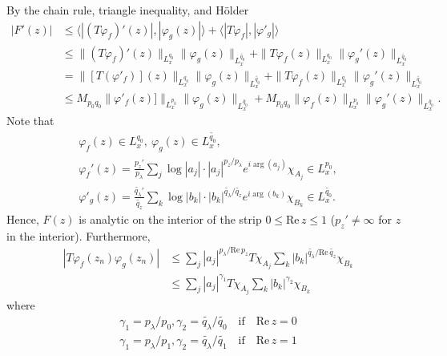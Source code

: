 \documentclass[12pt,reqno]{amsart}
\numberwithin{equation}{section}  %
\numberwithin{figure}{section}
\newcommand{\vp}{\varphi}
\theoremstyle{plain}
\theoremstyle{definition}
\theoremstyle{remark}
\begin{document}
%
%
By the chain rule, triangle inequality, and H{\"o}lder
%
%
\begin{equation*}
\begin{split}
| F'(z) |
& \le \langle | (T{\vp_f})'(z) |, | \vp_{g}(z) | \rangle + \langle | T
\vp_{f} |, |\vp'_{g}| \rangle
\\
& \le \| (T\vp_{f})'(z) \|_{L_x^{q_0}} \|\vp_{g}(z)\|_{L_x^{\tilde{q_0}}} + \|
T\vp_{f}(z) \|_{L_x^{q_0}} \|\vp_{g}'(z) \|_{L_x^{\tilde{q_0}}}
\\
& = \| [T( \vp'_{f})](z) \|_{L_x^{q_0}} \|\vp_{g}(z)\|_{L_x^{\tilde{q_0}}} + \|
T\vp_{f}(z) \|_{L_x^{q_0}} \|\vp_{g}'(z) \|_{L_x^{\tilde{q_0}}}
\\
& \le M_{p_0 q_0}
\| \vp'_{f}(z)] \|_{L_x^{p_0}} \|\vp_{g}(z)\|_{L_x^{\tilde{q_0}}} + M_{p_0 q_0}\|
\vp_{f}(z) \|_{L_x^{p_0}} \|\vp_{g}'(z) \|_{L_x^{\tilde{q_0}}}.
\end{split}
\end{equation*}
%
%
Note that
%
%
\begin{gather*}
	\vp_{f}(z) \in L^{q_0}_x, \ \vp_{g}(z) \in L_{x}^{\tilde{q_0}},
\\
\vp_{f}'(z) = \frac{p_z'}{p_\lambda} \sum_{j} \log |a_j| \cdot |
a_j|^{p_z/p_\lambda}e^{i \arg(a_j)} \chi_{A_j} \in L^{p_0}_x,
\\
\vp'_{g}(z) =  \frac{\tilde{q_\lambda}'}{\tilde{q_z}} \sum_{k} \log|b_k| \cdot
| b_k |^{\tilde{q_\lambda} / \tilde{q_z}} e^{i
\arg(b_k)} \chi_{B_k} \in L_{x}^{\tilde{q_0}}.
\end{gather*}
%
%
Hence, $F(z)$ is analytic on the interior of the strip $0 \le \text{Re}\, z \le
1$ ($p_z' \neq \infty$ for $z$ in the interior). Furthermore,
%
%
\begin{equation*}
\begin{split}
| T \vp_{f}(z_n) \vp_{g}(z_n) | 
& \le \sum_{j} | a_j |^{p_\lambda / \text{Re}\, p_z} T \chi_{A_j}
\sum_{k} | b_k |^{\tilde{q_\lambda} / \text{Re}\, \tilde{q_z}} \chi_{B_k}
\\
& \le \sum_{j} | a_j |^{\gamma_1} T \chi_{A_j}
\sum_{k} | b_k |^{\gamma_2} \chi_{B_k}\end{split}
\end{equation*}
%
%
where
%
%
\begin{gather*}
\gamma_1 = p_\lambda/p_0, \gamma_2 = \tilde{q_\lambda}/\tilde{q_0} \quad
\text{if} \quad \text{Re}\, z=0
\\
\gamma_1 = p_\lambda/p_1, \gamma_2 = \tilde{q_\lambda}/\tilde{q_1}\quad
\text{if} \quad \text{Re}\, z=1
\end{gather*}
\end{document}
